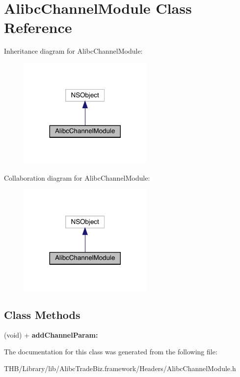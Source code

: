 \hypertarget{interface_alibc_channel_module}{}\section{Alibc\+Channel\+Module Class Reference}
\label{interface_alibc_channel_module}


Inheritance diagram for Alibc\+Channel\+Module\+:\nopagebreak
\begin{figure}[H]
\begin{center}
\leavevmode
\includegraphics[width=188pt]{interface_alibc_channel_module__inherit__graph}
\end{center}
\end{figure}


Collaboration diagram for Alibc\+Channel\+Module\+:\nopagebreak
\begin{figure}[H]
\begin{center}
\leavevmode
\includegraphics[width=188pt]{interface_alibc_channel_module__coll__graph}
\end{center}
\end{figure}
\subsection*{Class Methods}
\begin{DoxyCompactItemize}
\item 
\mbox{\label{interface_alibc_channel_module_a6a5345d95db141ea40368f3b58117323}} 
(void) + {\bfseries add\+Channel\+Param\+:}
\end{DoxyCompactItemize}


The documentation for this class was generated from the following file\+:\begin{DoxyCompactItemize}
\item 
T\+H\+B/\+Library/lib/\+Alibc\+Trade\+Biz.\+framework/\+Headers/Alibc\+Channel\+Module.\+h\end{DoxyCompactItemize}
